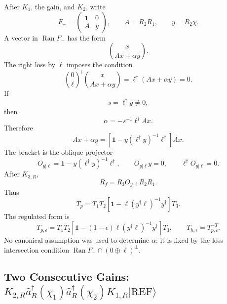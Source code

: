 \documentclass[aps,prb,onecolumn,nofootinbib,superscriptaddress]{revtex4-2}
\newcommand{\Id}{\mathbf{1}}
\newcommand{\REF}{\mathrm{REF}}
\newcommand{\Ran}{\operatorname{Ran}}
\newcommand{\ket}[1]{\lvert #1\rangle}
\newcommand{\ahat}{\hat a}
\newcommand{\eps}{\epsilon}
\begin{document}
After \(K_1\), the gain, and \(K_2\), write
\begin{equation}
  F_-=
  \begin{pmatrix}
    \Id & 0\\
    A & y
  \end{pmatrix},
  \qquad
  A=R_2R_1,\qquad y=R_2\chi.
  \label{eq:pre-loss-frame}
\end{equation}
A vector in \(\Ran F_-\) has the form
\begin{equation}
  \binom{x}{Ax+\alpha y}.
\end{equation}
The right loss by \(\ell\) imposes the condition
\begin{equation}
  \binom{0}{\ell}^\dagger
  \binom{x}{Ax+\alpha y}
  =
  \ell^\dagger(Ax+\alpha y)=0.
  \label{eq:loss-alpha-condition}
\end{equation}
If
\begin{equation}
  s=\ell^\dagger y\neq 0,
\end{equation}
then
\begin{equation}
  \alpha=-s^{-1}\ell^\dagger Ax.
  \label{eq:alpha-solution}
\end{equation}
Therefore
\begin{equation}
  Ax+\alpha y
  =
  \left[\Id-y(\ell^\dagger y)^{-1}\ell^\dagger\right]Ax.
\end{equation}
The bracket is the oblique projector
\begin{equation}
  O_{y|\ell}=\Id-y(\ell^\dagger y)^{-1}\ell^\dagger,
  \qquad
  O_{y|\ell}y=0,\qquad
  \ell^\dagger O_{y|\ell}=0.
\end{equation}
After \(K_{3,R}\),
\begin{equation}
  R_f=R_3O_{y|\ell}R_2R_1.
\end{equation}
Thus
\begin{equation}
  T_p
  =
  T_1T_2
  \left[\Id-\ell(y^\dagger\ell)^{-1}y^\dagger\right]T_3.
  \label{eq:gain-loss-Tp}
\end{equation}
The regulated form is
\begin{equation}
  T_{p,\eps}
  =
  T_1T_2
  \left[
    \Id-(1-\eps)\ell(y^\dagger\ell)^{-1}y^\dagger
  \right]T_3,
  \qquad
  T_{h,\eps}=T_{p,\eps}^{-T}.
  \label{eq:gain-loss-regulated}
\end{equation}
No canonical assumption was used to determine \(\alpha\): it is fixed by the
loss intersection condition \(\Ran F_-\cap (0\oplus\ell)^\perp\).

\subsection{\texorpdfstring{Two Consecutive Gains: \(K_{2,R}\ahat_R^\dagger(\chi_1)\ahat_R^\dagger(\chi_2)K_{1,R}\ket{\REF}\)}{Two Consecutive Gains}}
\end{document}
